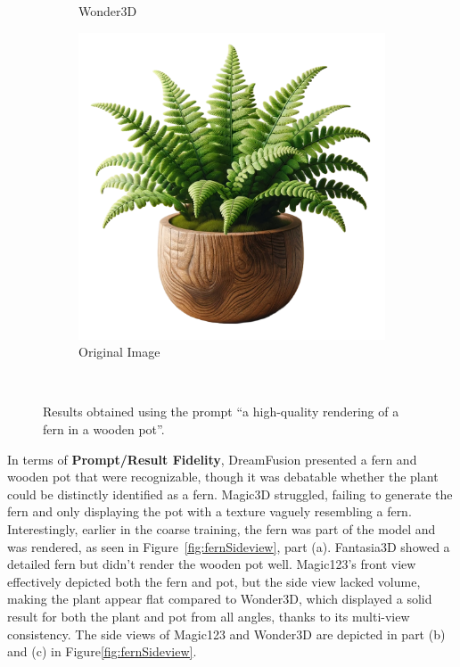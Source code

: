 \begin{figure}[ht]
\begin{subfigure}[b]{0.27\textwidth}
        \caption{Wonder3D}
        \vspace{0.1cm}
    \end{subfigure}
    \begin{subfigure}[b]{0.28\textwidth}
        \centering
        \includegraphics[width=\textwidth]{etc/Images/fern.png}
        \caption{Original Image}
        \vspace{0.1cm}
    \end{subfigure}
    \caption{Results obtained using the prompt ``a high-quality rendering of a fern in a wooden pot''.}~\label{fig:resultFern}
\end{figure}

In terms of \textbf{Prompt/Result Fidelity}, DreamFusion presented a fern and wooden pot that were recognizable, though it was debatable whether the plant could be distinctly identified as a fern. Magic3D struggled, failing to generate the fern and only displaying the pot with a texture vaguely resembling a fern. Interestingly, earlier in the coarse training, the fern was part of the model and was rendered, as seen in Figure~\ref{fig:fernSideview}, part (a). Fantasia3D showed a detailed fern but didn't render the wooden pot well. Magic123's front view effectively depicted both the fern and pot, but the side view lacked volume, making the plant appear flat compared to Wonder3D, which displayed a solid result for both the plant and pot from all angles, thanks to its multi-view consistency. The side views of Magic123 and Wonder3D are depicted in part (b) and (c) in Figure\ref{fig:fernSideview}.\\

